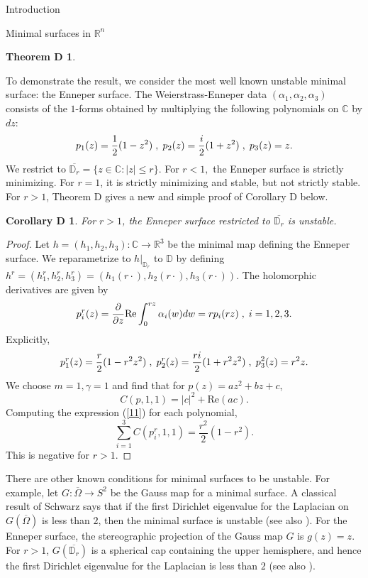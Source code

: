 \documentclass[10pt]{amsart}
\newcommand{\R}{\mathbb R}
\newtheorem*{thmd}{Theorem D}
\newtheorem*{cord}{Corollary D}
\theoremstyle{definition}
\begin{document}
\begin{section}{Introduction}
\begin{subsection}{Minimal surfaces in $\R^n$}
\begin{thmd}
\end{thmd}
To demonstrate the result, we consider the most well known unstable minimal surface: the Enneper surface. 
The Weierstrass-Enneper data $(\alpha_1,\alpha_2,\alpha_3)$ consists of the $1$-forms obtained by multiplying the following polynomials on $\mathbb{C}$ by $dz$: $$p_1(z) = \frac{1}{2}(1-z^2) \hspace{1mm} , \hspace{1mm} p_2(z) = \frac{i}{2}(1+z^2) \hspace{1mm} , \hspace{1mm} p_3(z)=z.$$ We restrict to $\overline{\mathbb{D}_r}=\{z\in\mathbb{C}:|z|\leq r\}$. For $r<1,$ the Enneper surface is strictly minimizing. For $r=1$, it is strictly minimizing and stable, but not strictly stable. For $r>1$, Theorem D gives a new and simple proof of Corollary D below.
\begin{cord}
For $r>1$, the Enneper surface restricted to $\overline{\mathbb{D}_r}$ is unstable.
\end{cord}
\begin{proof}
Let $h=(h_1,h_2,h_3):\mathbb{C}\to\mathbb{R}^3$ be the minimal map defining the Enneper surface. We reparametrize to $h|_{\mathbb{D}_r}$ to $\mathbb{D}$ by defining $h^r=(h_1^r,h_2^r,h_3^r)= (h_1(r\cdot), h_2(r\cdot), h_3(r\cdot)).$ The holomorphic derivatives are given by $$p_i^r(z) = \frac{\partial}{\partial z}\textrm{Re}\int_0^{rz} \alpha_i(w) dw = rp_i(rz) \hspace{1mm} , \hspace{1mm} i=1,2,3.$$ Explicitly, $$p_1^r(z) = \frac{r}{2}(1-r^2z^2) \hspace{1mm} , \hspace{1mm} p_2^r(z) = \frac{ri}{2}(1+r^2z^2) \hspace{1mm} , \hspace{1mm} p_3^2(z)=r^2z.$$ We choose $m=1, \gamma=1$ and find that for $p(z)=az^2 + bz + c$,
\begin{equation}\label{11}
    C(p,1,1) = |c|^2 + \textrm{Re}(ac).
\end{equation}
Computing the expression (\ref{11}) for each polynomial, $$\sum_{i=1}^3 C(p_i^r,1,1) = \frac{r^2}{2}(1-r^2).$$ This is negative for $r>1.$
\end{proof}
There are other known conditions for minimal surfaces to be unstable. For example, let $G:\overline{\Omega}\to S^2$ be the Gauss map for a minimal surface. A classical result of Schwarz says that if the first Dirichlet eigenvalue for the Laplacian on $G(\overline{\Omega})$ is less than $2$, then the minimal surface is unstable \cite{Sch} (see also \cite{BdC}). For the Enneper surface, the stereographic projection of the Gauss map $G$ is $g(z)=z$. For $r>1$, $G(\overline{\mathbb{D}_r})$ is a spherical cap containing the upper hemisphere, and hence the first Dirichlet eigenvalue for the Laplacian is less than $2$ (see also \cite[\S 117]{Ni}).

\end{subsection}
\end{section}
\end{document}
